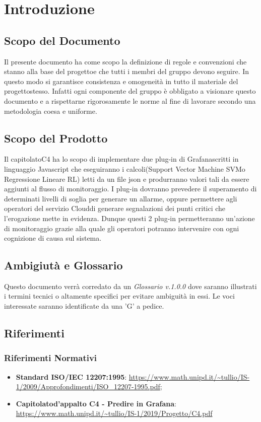 \section{Introduzione}
\subsection{Scopo del Documento}
Il presente documento ha come scopo la definizione di regole e convenzioni che stanno alla base del progetto\glosp e che tutti i membri del gruppo devono seguire. In questo modo si garantisce consistenza e omogeneità in tutto il materiale del progetto\glosp stesso. Infatti ogni componente del gruppo è obbligato a visionare questo documento e a rispettarne rigorosamente le norme al fine di lavorare secondo una metodologia coesa e uniforme.
\subsection{Scopo del Prodotto}
Il capitolato\glosp C4 ha lo scopo di implementare due plug-in di Grafana\glosp scritti in linguaggio Javascript che eseguiranno i calcoli(Support Vector Machine SVM\glosp o Regressione Lineare RL\glo) letti da un file json e produrranno valori tali da essere aggiunti al flusso di monitoraggio. I plug-in dovranno prevedere il superamento di determinati livelli di soglia per generare un allarme, oppure permettere agli operatori del servizio Cloud\glosp di generare segnalazioni dei punti critici che l'erogazione mette in evidenza.
Dunque questi 2 plug-in permetteranno un'azione di monitoraggio grazie alla quale gli operatori potranno intervenire con ogni cognizione di causa sul sistema.
\subsection{Ambigiutà e Glossario}
Questo documento verrà corredato da un \textit{Glossario v.1.0.0} dove saranno illustrati i termini tecnici o altamente specifici per evitare ambiguità in essi. Le voci interessate saranno identificate da una 'G' a pedice.
\subsection{Riferimenti}
\subsubsection{Riferimenti Normativi}
\begin{itemize}
	\item \textbf{Standard ISO/IEC 12207:1995}: 
	\url{https://www.math.unipd.it/~tullio/IS-1/2009/Approfondimenti/ISO_12207-1995.pdf};
	\item \textbf{Capitolato\glosp d'appalto C4 - Predire in Grafana}:  \url{https://www.math.unipd.it/~tullio/IS-1/2019/Progetto/C4.pdf}
\end{itemize}
